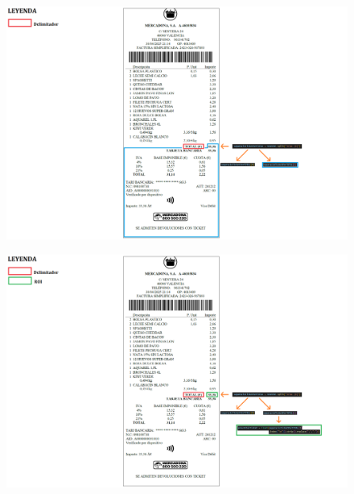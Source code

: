 \documentclass{beamer}
\begin{document}
		\begin{frame}
			\begin{figure}
				\centering
				\includegraphics[width=1\linewidth]{imgEspecifiques/ticketExtraccioD.png}
				\label{fig:ticketExtraccioD}
			\end{figure}
		\end{frame}
		
		\begin{frame}
			\begin{figure}
				\centering
				\includegraphics[width=1\linewidth]{imgEspecifiques/ticketExtraccioE.png}
				\label{fig:ticketExtraccioE}
			\end{figure}
		\end{frame}
		
\end{document}
